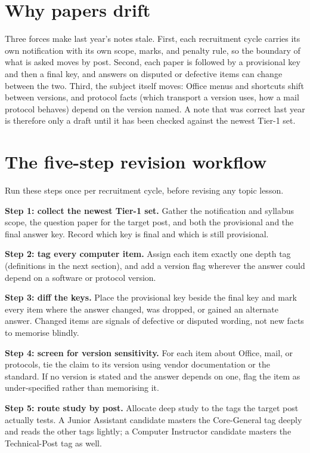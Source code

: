 \documentclass[11pt]{article}
\begin{document}
\section{Why papers drift}

Three forces make last year's notes stale. First, each recruitment cycle
carries its own notification with its own scope, marks, and penalty rule, so
the boundary of what is asked moves by post. Second, each paper is followed by
a provisional key and then a final key, and answers on disputed or defective
items can change between the two. Third, the subject itself moves: Office
menus and shortcuts shift between versions, and protocol facts (which
transport a version uses, how a mail protocol behaves) depend on the version
named. A note that was correct last year is therefore only a draft until it
has been checked against the newest Tier-1 set.

\section{The five-step revision workflow}

Run these steps once per recruitment cycle, before revising any topic lesson.

\textbf{Step 1: collect the newest Tier-1 set.} Gather the notification and
syllabus scope, the question paper for the target post, and both the
provisional and the final answer key. Record which key is final and which is
still provisional.

\textbf{Step 2: tag every computer item.} Assign each item exactly one depth
tag (definitions in the next section), and add a version flag wherever the
answer could depend on a software or protocol version.

\textbf{Step 3: diff the keys.} Place the provisional key beside the final key
and mark every item where the answer changed, was dropped, or gained an
alternate answer. Changed items are signals of defective or disputed wording,
not new facts to memorise blindly.

\textbf{Step 4: screen for version sensitivity.} For each item about Office,
mail, or protocols, tie the claim to its version using vendor documentation
or the standard. If no version is stated and the answer depends on one, flag
the item as under-specified rather than memorising it.

\textbf{Step 5: route study by post.} Allocate deep study to the tags the
target post actually tests. A Junior Assistant candidate masters the
Core-General tag deeply and reads the other tags lightly; a Computer
Instructor candidate masters the Technical-Post tag as well.
\end{document}
